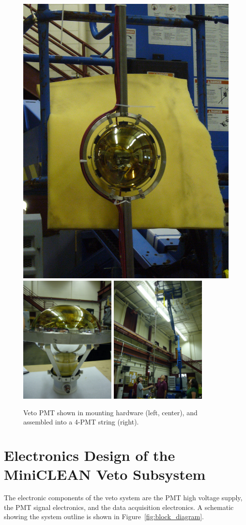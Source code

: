 \documentclass{JINST}
\begin{document}
\begin{figure}[ht]
\begin{center}
\includegraphics[width=2.in]{graphics/singlepmtmounted1.jpg}
\includegraphics[width=1.9in]{graphics/singlepmtmounted2.jpg}
\includegraphics[width=1.9in]{graphics/pmtstring.jpg}
\caption{Veto PMT shown in mounting hardware (left, center), and assembled into a 4-PMT string (right).
\label{fig:vetopmtmountpic}}
\end{center}
\end{figure}


\section{Electronics Design of the MiniCLEAN Veto Subsystem}
\label{sec:electronics_design}
%
The electronic components of the veto system are the PMT high voltage
supply, the PMT signal electronics, and the data acquisition
electronics.  A schematic showing the system outline is shown in
Figure~\ref{fig:block_diagram}.
\end{document}
